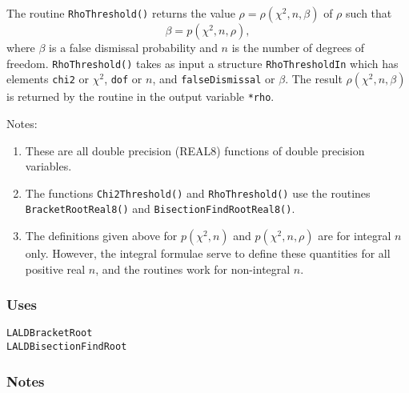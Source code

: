 The routine \verb+RhoThreshold()+ returns the value $\rho =
\rho(\chi^2,n,\beta)$ of $\rho$ such that 
$$
\beta = p(\chi^2,n,\rho),
$$
where $\beta$ is a false dismissal probability and $n$ is the number
of degrees of freedom.  \verb+RhoThreshold()+ takes as input a
structure \verb+RhoThresholdIn+ which has elements \verb+chi2+ or
$\chi^2$, \verb+dof+ or $n$, and \verb+falseDismissal+ or $\beta$.
The result $\rho(\chi^2,n,\beta)$ is returned by the routine in the
output variable \verb+*rho+. 


Notes:
\begin{enumerate}
\item These are all double precision (REAL8) functions of double
precision variables.
\item The functions \verb+Chi2Threshold()+ and \verb+RhoThreshold()+
use the routines \verb+BracketRootReal8()+ and
\verb+BisectionFindRootReal8()+. 
\item The definitions given above for $p(\chi^2,n)$ and
$p(\chi^2,n,\rho)$ are for integral $n$ only.  However,
the integral formulae serve to define these quantities for all
positive real $n$, and the routines work for non-integral $n$.
\end{enumerate}

\subsubsection*{Uses}
\begin{verbatim}
LALDBracketRoot
LALDBisectionFindRoot

\end{verbatim}
\subsubsection*{Notes}

\vfill{\footnotesize}







